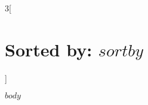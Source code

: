 \documentclass[14pt,a4paper]{article}
\begin{document}
\begin{multicols}{3}[\section*{Sorted by: $sortby$}]

$body$

\end{multicols}
\end{document}

